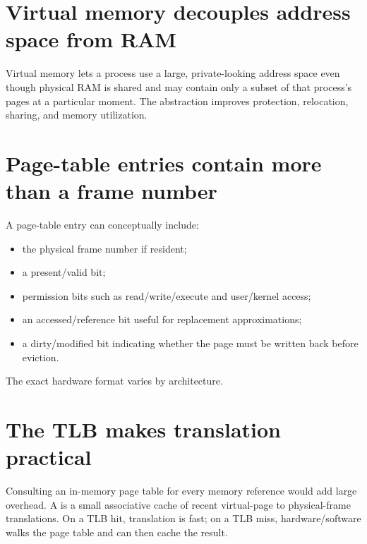 \section{Virtual memory decouples address space from RAM}
Virtual memory lets a process use a large, private-looking address space even though physical RAM is shared and may contain only a subset of that process's pages at a particular moment. The abstraction improves protection, relocation, sharing, and memory utilization.

\section{Page-table entries contain more than a frame number}
A page-table entry can conceptually include:
\begin{itemize}
  \item the physical frame number if resident;
  \item a present/valid bit;
  \item permission bits such as read/write/execute and user/kernel access;
  \item an accessed/reference bit useful for replacement approximations;
  \item a dirty/modified bit indicating whether the page must be written back before eviction.
\end{itemize}
The exact hardware format varies by architecture.

\section{The TLB makes translation practical}
Consulting an in-memory page table for every memory reference would add large overhead. A  is a small associative cache of recent virtual-page to physical-frame translations. On a TLB hit, translation is fast; on a TLB miss, hardware/software walks the page table and can then cache the result.

\begin{mlfigure}
\end{mlfigure}

